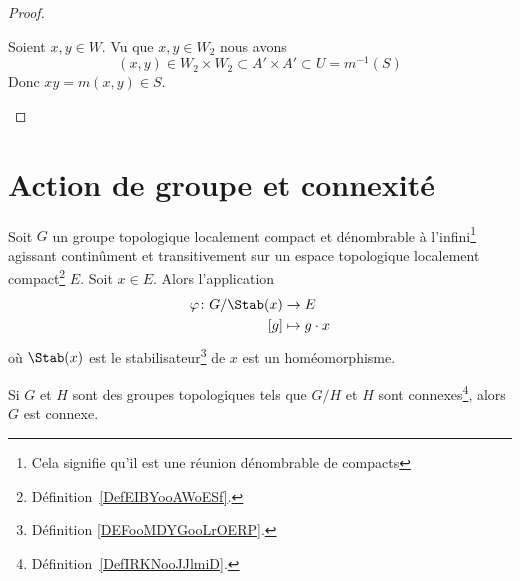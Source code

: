 \begin{proof}
\begin{subproof}
		\spitem[\( WW\subset S\)]
		Soient \( x,y\in W\). Vu que \( x,y\in W_2\) nous avons
		\begin{equation}
			(x,y)\in W_2\times W_2\subset A'\times A'\subset U=m^{-1}(S)
		\end{equation}
		Donc \( xy=m(x,y)\in S\).
	\end{subproof}
\end{proof}


\section{Action de groupe et connexité}

\begin{theorem}     \label{ThojrLKZk}
	Soit \( G\) un groupe topologique localement compact et dénombrable à l'infini\footnote{Cela signifie qu'il est une réunion dénombrable de compacts} agissant continûment et transitivement sur un espace topologique localement compact\footnote{Définition~\ref{DefEIBYooAWoESf}.} \( E\). Soit \( x\in E\). Alors l'application
	\begin{equation}
		\begin{aligned}
			\varphi\colon G/\Stab(x) & \to E            \\
			[g]                      & \mapsto g\cdot x
		\end{aligned}
	\end{equation}
	où \( \Stab(x)\) est le stabilisateur\footnote{Définition \ref{DEFooMDYGooLrOERP}.} de \( x\) est un homéomorphisme.
\end{theorem}

\begin{lemma}       \label{LemkLRAet}
	Si \( G\) et \( H\) sont des groupes topologiques tels que \( G/H\) et \( H\) sont connexes\footnote{Définition~\ref{DefIRKNooJJlmiD}.}, alors \( G\) est connexe.
\end{lemma}


